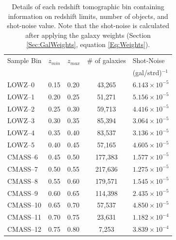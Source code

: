 \begin{table}
\centering
\caption[Tomographic redshift bins limits, number of galaxies, and shot-noise levels.]{Details of each redshift tomographic bin containing information on redshift limits, number of objects, and shot-noise value. Note that the shot-noise is calculated after applying the galaxy weights (Section \ref{Sec:GalWeights}, equation \eqref{Eq:Weights}).}
\label{Tb:Shells}
\begin{tabular}{lllcl}
\hline
\hline
Sample Bin & $z_{min}$ & $z_{max}$ & \# of galaxies & Shot-Noise \\ & & & & (gal/strd)$^{-1}$ \\
\hline 
\hline
LOWZ--0  & 0.15      & 0.20      &   43,265   & $6.143 \times 10^{-5} $\\
LOWZ--1  & 0.20      & 0.25      &   51,271   & $5.156 \times 10^{-5} $\\
LOWZ--2  & 0.25      & 0.30      &   59,713   & $4.416 \times 10^{-5} $\\
LOWZ--3  & 0.30      & 0.35      &   85,394   & $3.064 \times 10^{-5} $\\
LOWZ--4  & 0.35      & 0.40      &   83,537   &  $3.136\times 10^{-5} $\\
LOWZ--5  & 0.40      & 0.45      &   57,165   &  $4.605 \times 10^{-5} $\\
CMASS--6 & 0.45      & 0.50      &   177,383  &  $1.577\times 10^{-5} $\\
CMASS--7 & 0.50      & 0.55      &   217,636  &  $1.275\times 10^{-5}$ \\
CMASS--8 & 0.55      & 0.60      &   179,571  &  $1.545\times 10^{-5}$ \\
CMASS--9 & 0.60      & 0.65      &   114,398  &  $2.435 \times 10^{-5}$ \\
CMASS--10 & 0.65      & 0.70      &   57,537   &  $4.850 \times 10^{-5}$ \\
CMASS--11 & 0.70      & 0.75      &   23,631   &  $1.182 \times 10^{-4}$ \\
CMASS--12 & 0.75      & 0.80      &    7,253   &  $3.839 \times 10^{-4}$\\
\hline
\hline
\end{tabular}
\end{table}


